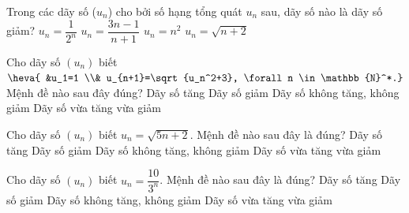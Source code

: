 \begin{ex}%
	Trong các dãy số  ($u_n$) cho bởi số hạng tổng quát $u_n$ sau, dãy số nào là dãy số giảm?
	\choice 
		 {\True $u_n=\dfrac{1}{2^n}$}
		{$u_n=\dfrac{3n-1}{n+1}$} 
		{$u_n=n^2$} 
		{$u_n=\sqrt{n+2}$} 
\end{ex}

\begin{ex}%
	 Cho dãy số $(u_n)$ biết $\heva{ &u_1=1 \\& u_{n+1}=\sqrt{u_n^2+3}, \forall n \in \mathbb{N}^*.}$ Mệnh đề nào sau đây đúng?
	 \choice
		{\True Dãy số tăng} 
		{Dãy số giảm} 
		{Dãy số không tăng,  không giảm}
		{Dãy số vừa tăng vừa  giảm}
\end{ex}

\begin{ex}%
	Cho dãy số $(u_n)$ biết $u_n=\sqrt{5n+2}$. Mệnh đề nào sau đây  là đúng?
	\choice 
		{\True  Dãy số tăng}
		{Dãy  số giảm}
		 {Dãy số không tăng, không giảm}
		{Dãy số vừa  tăng vừa giảm}
\end{ex}

\begin{ex}%
	Cho dãy số $(u_n)$ biết $u_n=\dfrac{10}{3^n}$. Mệnh  đề nào sau đây là đúng?
	\choice 
		{Dãy số tăng} 
		{\True Dãy số  giảm}
		{Dãy số không tăng, không  giảm}
		{Dãy số vừa tăng vừa giảm} 
\end{ex}


